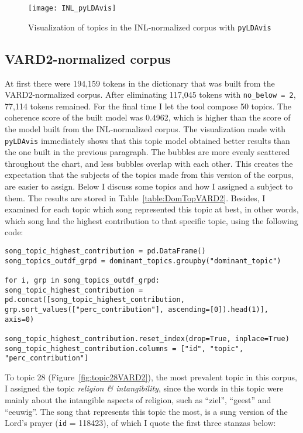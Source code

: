 \begin{figure}[hbt!]
	\centering
	\texttt{[image: INL\_pyLDAvis]}
	\caption{Visualization of topics in the INL-normalized corpus with \texttt{pyLDAvis}}
	\label{fig:pyLDAvisINL}
\end{figure}

\subsection{VARD2-normalized corpus}
At first there were 194,159 tokens in the dictionary that was built from the VARD2-normalized corpus. After eliminating 117,045 tokens with \texttt{no\_below = 2}, 77,114 tokens remained. For the final time I let the tool compose 50 topics. The coherence score of the built model was 0.4962, which is higher than the score of the model built from the INL-normalized corpus. The visualization made with \texttt{pyLDAvis} immediately shows that this topic model obtained better results than the one built in the previous paragraph. The bubbles are more evenly scattered throughout the chart, and less bubbles overlap with each other. This creates the expectation that the subjects of the topics made from this version of the corpus, are easier to assign. Below I discuss some topics and how I assigned a subject to them. The results are stored in Table~\ref{table:DomTopVARD2}. Besides, I examined for each topic which song represented this topic at best, in other words, which song had the highest contribution to that specific topic, using the following code: 

\begin{lstlisting}
song_topic_highest_contribution = pd.DataFrame()
song_topics_outdf_grpd = dominant_topics.groupby("dominant_topic")

for i, grp in song_topics_outdf_grpd:
song_topic_highest_contribution = pd.concat([song_topic_highest_contribution, grp.sort_values(["perc_contribution"], ascending=[0]).head(1)], axis=0)

song_topic_highest_contribution.reset_index(drop=True, inplace=True)
song_topic_highest_contribution.columns = ["id", "topic", "perc_contribution"]
\end{lstlisting}

To topic 28 (Figure~\ref{fig:topic28VARD2}), the most prevalent topic in this corpus, I assigned the topic \textit{religion \& intangibility}, since the words in this topic were mainly about the intangible aspects of religion, such as \enquote{ziel}, \enquote{geest} and \enquote{eeuwig}. The song that represents this topic the most, is a sung version of the Lord's prayer (\texttt{id} = 118423), of which I quote the first three stanzas below:

